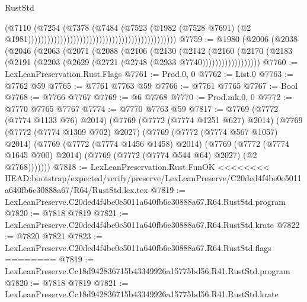 \begin{lexlean}{RustStd}
\begin{coremodule}
{\begin{coremodule}
{{{{{{{{{{{{{{{{{{{{{{{{{{{{{{{{{{{{{{{{{{{{{{{{{{{{{{                                                                                  (@7110
                                                                                    (@7254
                                                                                      (@7378
                                                                                        (@7484
                                                                                          (@7523
                                                                                            (@1982
                                                                                              (@7528
                                                                                                @7691)
                                                                                              (@2
                                                                                                @1981))))))))))))))))))))))))))))))))))))))))))))))
@7759 := @1980
    (@2006
      (@2038
        (@2046
          (@2063
            (@2071
              (@2088
                (@2106
                  (@2130
                    (@2142
                      (@2160
                        (@2170
                          (@2183 (@2191 (@2203 (@2629 (@2721 (@2748 (@2933 @7740))))))))))))))))))
@7760 := LexLeanPreservation.Rust.Flags
@7761 := Prod.{0, 0}
@7762 := List.{0}
@7763 := @7762 @59
@7765 := @7761 @7763 @59
@7766 := @7761 @7765
@7767 := Bool
@7768 := @7766 @7767
@7769 := @6 @7768
@7770 := Prod.mk.{0, 0}
@7772 := @7770 @7765 @7767
@7774 := @7770 @7763 @59
@7817 := @7769
    (@7772 (@7774 @1133 @76) @2014)
    (@7769
      (@7772 (@7774 @1251 @627) @2014)
      (@7769
        (@7772 (@7774 @1309 @702) @2027)
        (@7769
          (@7772 (@7774 @567 @1057) @2014)
          (@7769
            (@7772 (@7774 @1456 @1458) @2014)
            (@7769
              (@7772 (@7774 @1645 @700) @2014)
              (@7769 (@7772 (@7774 @544 @64) @2027) (@2 @7768)))))))
@7818 := LexLeanPreservation.Rust.FunOK
<<<<<<<< HEAD:bootstrap/expected/verify/preserve/LexLeanPreserve/C20ded4f4be0e5011a640fb6c30888a67/R64/RustStd.lex.tex
@7819 := LexLeanPreserve.C20ded4f4be0e5011a640fb6c30888a67.R64.RustStd.program
@7820 := @7818 @7819
@7821 := LexLeanPreserve.C20ded4f4be0e5011a640fb6c30888a67.R64.RustStd.krate
@7822 := @7820 @7821
@7823 := LexLeanPreserve.C20ded4f4be0e5011a640fb6c30888a67.R64.RustStd.flags
========
@7819 := LexLeanPreserve.Cc18d942836715b43349926a15775bd56.R41.RustStd.program
@7820 := @7818 @7819
@7821 := LexLeanPreserve.Cc18d942836715b43349926a15775bd56.R41.RustStd.krate
}}}}}}}}}}}}}}}}}}}}}}}}}}}}}}}}}}}}}}}}}}}}}}}}}}}}}}
\end{coremodule}}
\end{coremodule}
\end{lexlean}
